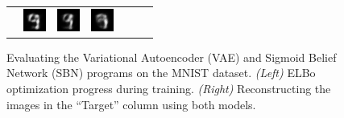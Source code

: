 \begin{figure}
\begin{minipage}{0.5\linewidth}
\begin{tabular}{c  c c c c c c}
\hspace{3pt}
& \includegraphics[width=0.12\linewidth]{figs/results/vae_sbn/sbn_encodeDecode_target_003_sample_001.png}
& \includegraphics[width=0.12\linewidth]{figs/results/vae_sbn/sbn_encodeDecode_target_003_sample_002.png}
& \includegraphics[width=0.12\linewidth]{figs/results/vae_sbn/sbn_encodeDecode_target_003_sample_003.png}
\end{tabular}
\end{minipage}
\caption{Evaluating the Variational Autoencoder (VAE) and Sigmoid Belief Network (SBN) programs on the MNIST dataset. \emph{(Left)} ELBo optimization progress during training. \emph{(Right)} Reconstructing the images in the ``Target'' column using both models.}
\label{fig:vae_sbn_results}
\end{figure}


%
